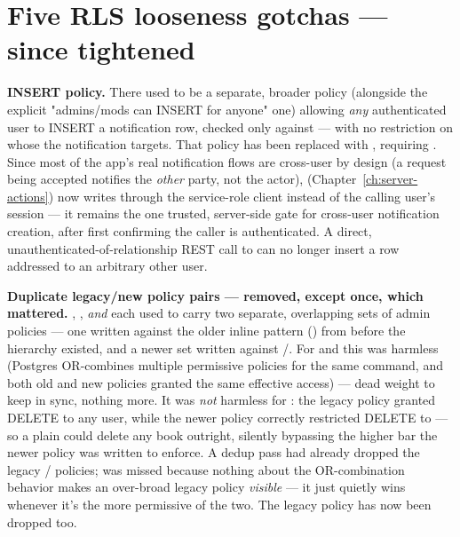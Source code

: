 \section{Five RLS looseness gotchas — since tightened}

\begin{olknote}
\textbf{ INSERT policy.} There used to be a separate, broader policy (alongside the explicit "admins/mods can INSERT for anyone" one) allowing \emph{any} authenticated user to INSERT a notification row, checked only against  — with no restriction on whose  the notification targets. That policy has been replaced with , requiring . Since most of the app's real notification flows are cross-user by design (a request being accepted notifies the \emph{other} party, not the actor),  (Chapter~\ref{ch:server-actions}) now writes through the service-role client instead of the calling user's session — it remains the one trusted, server-side gate for cross-user notification creation, after first confirming the caller is authenticated. A direct, unauthenticated-of-relationship REST call to  can no longer insert a row addressed to an arbitrary other user.
\end{olknote}

\begin{olknote}
\textbf{Duplicate legacy/new policy pairs — removed, except once, which mattered.} , , \emph{and}  each used to carry two separate, overlapping sets of admin policies — one written against the older inline pattern () from before the  hierarchy existed, and a newer set written against /. For  and  this was harmless (Postgres OR-combines multiple permissive policies for the same command, and both old and new policies granted the same effective access) — dead weight to keep in sync, nothing more. It was \emph{not} harmless for : the legacy  policy granted DELETE to any  user, while the newer  policy correctly restricted DELETE to  — so a plain  could delete any book outright, silently bypassing the higher bar the newer policy was written to enforce. A dedup pass had already dropped the legacy / policies;  was missed because nothing about the OR-combination behavior makes an over-broad legacy policy \emph{visible} — it just quietly wins whenever it's the more permissive of the two. The legacy  policy has now been dropped too.
\end{olknote}

